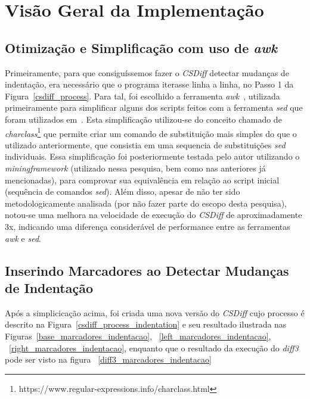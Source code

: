 \section{Visão Geral da Implementação}\label{implementacao}
\subsection{Otimização e Simplificação com uso de \emph{awk}}
Primeiramente, para que consiguíssemos fazer o \emph{CSDiff} detectar mudanças de indentação, era necessário
que o programa iterasse linha a linha, no Passo 1 da Figura~\ref{csdiff_process}.
Para tal, foi escolhido a ferramenta \emph{awk}~\cite{awk}, utilizada primeiramente para
simplificar alguns dos scripts feitos com a ferramenta \emph{sed} que foram utilizados em~\cite{clem21,heitor21}.
Esta simplificação
utilizou-se do conceito chamado de \emph{charclass}\footnote{https://www.regular-expressions.info/charclass.html}
que permite criar um comando de substituição mais simples do que o utilizado anteriormente, que consistia em uma sequencia de
substituições \emph{sed} individuais. Essa simplificação foi posteriormente testada pelo autor utilizando
o \emph{miningframework} (utilizado nessa pesquisa, bem como nas anteriores já mencionadas), para comprovar sua equivalência em
relação ao script inicial (sequência de comandos \emph{sed}). Além disso, apesar de não ter sido
metodologicamente analisada (por não fazer parte do escopo desta pesquisa),
notou-se uma melhora na velocidade de execução do
\emph{CSDiff} de aproximadamente 3x, indicando uma diferença considerável de performance entre as ferramentas
\emph{awk} e \emph{sed}.

\subsection{Inserindo Marcadores ao Detectar Mudanças de Indentação}
Após a simplicicação acima, foi criada uma nova versão do \emph{CSDiff} cujo processo é descrito na
Figura~\ref{csdiff_process_indentation} e seu resultado ilustrada nas Figuras~\ref{base_marcadores_indentacao},
~\ref{left_marcadores_indentacao},
~\ref{right_marcadores_indentacao}, enquanto que o resultado da execução do \emph{diff3} pode ser visto na figura
~\ref{diff3_marcadores_indentacao}

